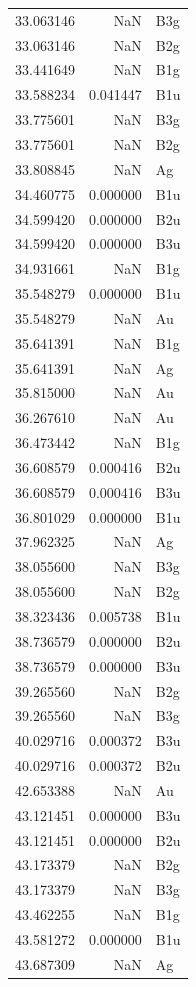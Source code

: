 \begin{longtable}{rrl}
33.063146 & NaN & B3g \\
33.063146 & NaN & B2g \\
33.441649 & NaN & B1g \\
33.588234 & 0.041447 & B1u \\
33.775601 & NaN & B3g \\
33.775601 & NaN & B2g \\
33.808845 & NaN & Ag \\
34.460775 & 0.000000 & B1u \\
34.599420 & 0.000000 & B2u \\
34.599420 & 0.000000 & B3u \\
34.931661 & NaN & B1g \\
35.548279 & 0.000000 & B1u \\
35.548279 & NaN & Au \\
35.641391 & NaN & B1g \\
35.641391 & NaN & Ag \\
35.815000 & NaN & Au \\
36.267610 & NaN & Au \\
36.473442 & NaN & B1g \\
36.608579 & 0.000416 & B2u \\
36.608579 & 0.000416 & B3u \\
36.801029 & 0.000000 & B1u \\
37.962325 & NaN & Ag \\
38.055600 & NaN & B3g \\
38.055600 & NaN & B2g \\
38.323436 & 0.005738 & B1u \\
38.736579 & 0.000000 & B2u \\
38.736579 & 0.000000 & B3u \\
39.265560 & NaN & B2g \\
39.265560 & NaN & B3g \\
40.029716 & 0.000372 & B3u \\
40.029716 & 0.000372 & B2u \\
42.653388 & NaN & Au \\
43.121451 & 0.000000 & B3u \\
43.121451 & 0.000000 & B2u \\
43.173379 & NaN & B2g \\
43.173379 & NaN & B3g \\
43.462255 & NaN & B1g \\
43.581272 & 0.000000 & B1u \\
43.687309 & NaN & Ag \\

\end{longtable}
